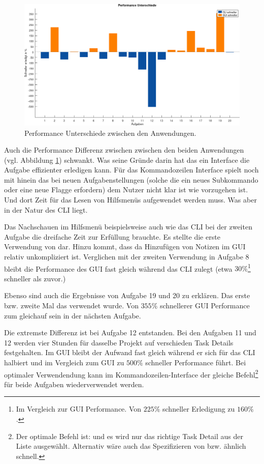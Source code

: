 \documentclass[oneside,bibliography=totocnumbered,BCOR=5mm]{scrbook}
\begin{document}
\medskip

\begin{figure}[H]
  \centering
  \includegraphics[scale=0.36]{performance-diff.png}
  \caption{Performance Unterschiede zwischen den Anwendungen.}
  \label{fig:performance-diff}
\end{figure}

Auch die Performance Differenz zwischen zwischen den beiden Anwendungen (vgl.
Abbildung \ref{fig:performance-diff}) schwankt. Was seine Gründe darin hat das
ein Interface die Aufgabe effizienter erledigen kann. Für das Kommandozeilen
Interface spielt noch mit hinein das bei neuen Aufgabenstellungen (solche die
ein neues Subkommando oder eine neue Flagge erfordern) dem Nutzer nicht klar
ist wie vorzugehen ist. Und dort Zeit für das Lesen von Hilfsmenüs aufgewendet
werden muss. Was aber in der Natur des CLI liegt.

Das Nachschauen im Hilfsmenü beispielsweise auch wie das CLI bei der zweiten
Aufgabe die dreifache Zeit zur Erfüllung brauchte. Es stellte die erste
Verwendung von  dar. Hinzu kommt, dass da Hinzufügen von
Notizen im GUI relativ unkompliziert ist. Verglichen mit der zweiten Verwendung
in Aufgabe 8 bleibt die Performance des GUI fast gleich während das CLI zulegt
(etwa $30\%$\footnote{Im Vergleich zur GUI Performance. Von $225\%$ schneller
Erledigung zu $160\%$.} schneller als zuvor.)

Ebenso sind auch die Ergebnisse von Aufgabe 19 und 20 zu erklären. Das erste
bzw. zweite Mal das  verwendet wurde. Von $355\%$
schnellerer GUI Performance zum gleichauf sein in der nächsten Aufgabe.

Die extremste Differenz ist bei Aufgabe 12 entstanden. Bei den Aufgaben 11
und 12 werden vier Stunden für dasselbe Projekt auf verschieden Task Details
festgehalten. Im GUI bleibt der Aufwand fast gleich während er sich für
das CLI halbiert und im Vergleich zum GUI zu $500\%$ schneller Performance
führt. Bei optimaler Verwendendung kann im Kommandozeilen-Interface der
gleiche Befehl\footnote{Der optimale Befehl ist:  und es wird nur das richtige Task Detail aus der Liste
ausgewählt. Alternativ wäre auch das Spezifizieren von  bzw.
 ähnlich schnell.} für beide Aufgaben wiederverwendet werden.
\end{document}
